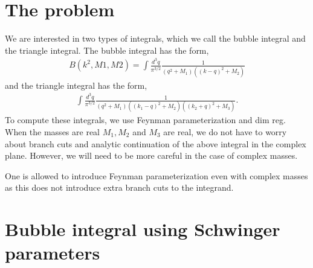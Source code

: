\documentclass[twoside]{article}
\begin{document}
\section{The problem}
We are interested in two types of integrals, which we call the bubble integral and the triangle integral. The bubble integral has the form,
\begin{align}
\label{eq:bubble}
B(k^2,M1,M2) =  \int \frac{d^3q}{\pi^{3/2}}\frac{1}{(q^2 + M_1)( (k-q)^2 + M_2)}
\end{align}
and the triangle integral has the form,
\begin{align}
  \int \frac{d^3q}{\pi^{3/2}}\frac{1}{(q^2 + M_1)( (k_1-q)^2 + M_2)( (k_2 + q)^2 + M_3)}.
\end{align}
To compute these integrals, we use Feynman parameterization and dim reg. When the masses are real $M_1,M_2$ and $M_3$ are real, we do not
have to worry about branch cuts and analytic continuation of the above integral in the complex plane. However, we will need to be more
careful in the case of complex masses. 

One is allowed to introduce Feynman parameterization even with complex masses as this does not introduce extra branch cuts to the integrand.

\section{Bubble integral using Schwinger parameters}
\end{document}
